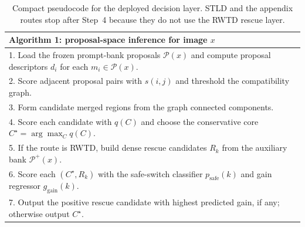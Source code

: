 \begin{table}[t]
\centering
\footnotesize
\setlength{\tabcolsep}{0pt}
\renewcommand{\arraystretch}{1.02}
\begin{tabularx}{\columnwidth}{@{}X@{}}
\toprule
\textbf{Algorithm 1: \sys{} proposal-space inference for image $x$} \\
\midrule
1. Load the frozen prompt-bank proposals $\mathcal{P}(x)$ and compute proposal descriptors $d_i$ for each $m_i \in \mathcal{P}(x)$. \\
2. Score adjacent proposal pairs with $s(i,j)$ and threshold the compatibility graph. \\
3. Form candidate merged regions from the graph connected components. \\
4. Score each candidate with $q(C)$ and choose the conservative core $C^\star = \arg\max_C q(C)$. \\
5. If the route is RWTD, build dense rescue candidates $R_k$ from the auxiliary bank $\mathcal{P}^{+}(x)$. \\
6. Score each $(C^\star, R_k)$ with the safe-switch classifier $p_{\mathrm{safe}}(k)$ and gain regressor $g_{\mathrm{gain}}(k)$. \\
7. Output the positive rescue candidate with highest predicted gain, if any; otherwise output $C^\star$. \\
\bottomrule
\end{tabularx}
\caption{Compact pseudocode for the deployed decision layer. STLD and the appendix routes stop after Step~4 because they do not use the RWTD rescue layer.}
\label{tab:algorithm_box}
\end{table}
